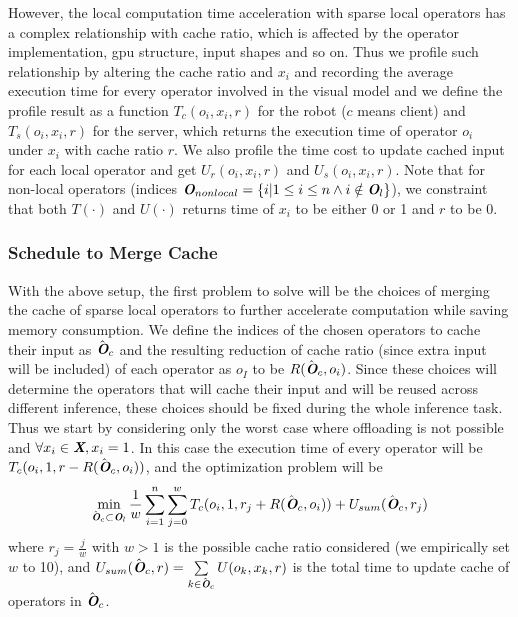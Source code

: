 However, the local computation time acceleration with sparse local operators has a complex relationship with cache ratio, which is affected by the operator implementation, gpu structure, input shapes and so on.
Thus we profile such relationship by altering the cache ratio and $x_i$ and recording the average execution time for every operator involved in the visual model and we define the profile result as a function $T_c(o_i, x_i, r)$ for the robot ($c$ means client) and $T_s(o_i, x_i, r)$ for the server, which returns the execution time of operator $o_i$ under $x_i$ with cache ratio $r$.
We also profile the time cost to update cached input for each local operator and get $U_r(o_i, x_i, r)$ and $U_s(o_i, x_i, r)$.
Note that for non-local operators (indices $\textit{\textbf{O}}_{nonlocal}=\{i|1\le i\le n \land i \notin \textit{\textbf{O}}_l\}$), we constraint that both $T(\cdot)$ and $U(\cdot)$ returns time of $x_i$ to be either 0 or 1 and $r$ to be 0.

\subsubsection{Schedule to Merge Cache}
With the above setup, the first problem to solve will be the choices of merging the cache of sparse local operators to further accelerate computation while saving memory consumption.
We define the indices of the chosen operators to cache their input as $\hat{\textit{\textbf{O}}}_c$ and the resulting reduction of cache ratio (since extra input will be included) of each operator as $o_I$ to be $R(\hat{\textit{\textbf{O}}}_c, o_i)$.
Since these choices will determine the operators that will cache their input and will be reused across different inference, these choices should be fixed during the whole inference task.
Thus we start by considering only the worst case where offloading is not possible and $\forall x_i\in \textit{\textbf{X}}, x_i=1$.
In this case the execution time of every operator will be $T_c(o_i, 1, r-R(\hat{\textit{\textbf{O}}}_c, o_i))$, and the optimization problem will be 
\begin{equation}
    \min\limits_{\hat{\textit{\textbf{O}}}_c \subset \textit{\textbf{O}}_l} \frac{1}{w} \sum_{i=1}^n \sum_{j=0}^w T_c(o_i, 1, r_j+R(\hat{\textit{\textbf{O}}}_c, o_i)) + U_{sum}(\hat{\textit{\textbf{O}}}_c, r_j)
    \label{eq:cached op}
\end{equation}
where $r_j = \frac{j}{w}$ with $w>1$ is the possible cache ratio considered (we empirically set $w$ to 10), and $U_{sum}(\hat{\textit{\textbf{O}}}_c, r) = \sum\limits_{k \in \hat{\textit{\textbf{O}}}_c} U(o_k, x_k, r)$ is the total time to update cache of operators in $\hat{\textit{\textbf{O}}}_c$.

